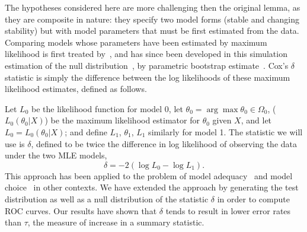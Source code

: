 \documentclass[authoryear,review,11pt]{elsarticle}
\begin{document}
The hypotheses considered here are more challenging then the original lemma, as they are composite in nature:
they specify two model forms (stable and changing stability)
but with model parameters that must be first estimated from the data.
Comparing models whose parameters have been estimated by maximum likelihood is first treated by~\citet{Cox1961, Cox1962},
and has since been developed in this simulation estimation of the null distribution~\citep{McLachlan1987}, by parametric bootstrap estimate~\citep{Efron1987}.  
Cox's $\delta$ statistic is simply the difference between the log likelihoods of these maximum likelihood estimates, defined as follows.

Let $L_0$ be the likelihood function for model 0, 
let $\theta_0 = \arg \max \theta_0 \in \Omega_0$, ($L_0 (\theta_0 |X)$) 
be the maximum likelihood estimator for $\theta_0$ given $X$, and let $L_0 = L_0 (\theta_0 |X)$; 
and define $L_1$, $\theta_1$, $L_1$ similarly for model 1. 
The statistic we will use is $\delta$, 
defined to be twice the difference in log likelihood of observing the data under the two MLE models,
\begin{equation}\label{delta}
\delta = -2 (\log L_0 - \log L_1 ).
\end{equation}
This approach has been applied to the problem of model adequacy~\citep{Goldman1993} and model choice~\citep{Huelsenbeck1996} in other contexts.  
We have extended the approach by generating the test distribution as well as a null distribution of the statistic $\delta$ in order to compute ROC curves.  
Our results have shown that $\delta$ tends to result in lower error rates than $\tau$, the measure of increase in a summary statistic.  
\end{document}
